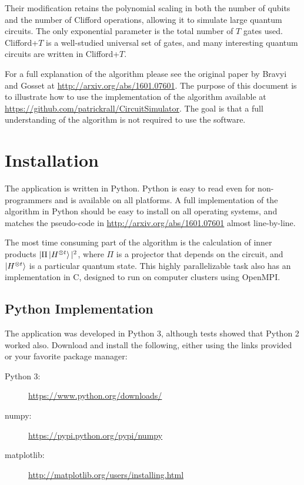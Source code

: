 \documentclass[11pt]{article}
\begin{document}
Their modification retains the polynomial scaling in both the number of qubits and the number of Clifford operations, allowing it to simulate large quantum circuits. The only exponential parameter is the total number of $T$ gates used. Clifford+$T$ is a well-studied universal set of gates, and many interesting quantum circuits are written in Clifford+$T$.

For a full explanation of the algorithm please see the original paper by Bravyi and Gosset at \url{http://arxiv.org/abs/1601.07601}. The purpose of this document is to illustrate how to use the implementation of the algorithm available at \url{https://github.com/patrickrall/CircuitSimulator}. The goal is that a full understanding of the algorithm is not required to use the software.

\clearpage
\tableofcontents

\clearpage
\section{Installation}

The application is written in Python. Python is easy to read even for non-programmers and is available on all platforms. A full implementation of the algorithm in Python should be easy to install on all operating systems, and matches the pseudo-code in \url{http://arxiv.org/abs/1601.07601} almost line-by-line.

The most time consuming part of the algorithm is the calculation of inner products $|\Pi\ket{H^{\otimes t}}|^2$, where $\Pi$ is a projector that depends on the circuit, and $\ket{H^{\otimes t}}$ is a particular quantum state. This highly parallelizable task also has an implementation in C, designed to run on computer clusters using OpenMPI.

\subsection{Python Implementation}

The application was developed in Python 3, although tests showed that Python 2 worked also. Download and install the following, either using the links provided or your favorite package manager:

\begin{description}
    \item[Python 3:] \url{https://www.python.org/downloads/}
    \item[numpy:] \url{https://pypi.python.org/pypi/numpy}
    \item[matplotlib:] \url{http://matplotlib.org/users/installing.html}
\end{description}
\end{document}
